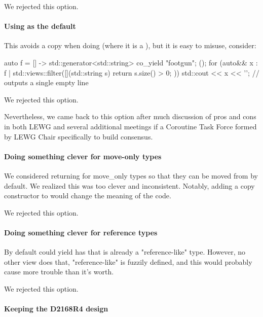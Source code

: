 \documentclass{wg21}
\begin{document}
We rejected this option.

\paragraph{Using  as the default}

This avoids a copy when doing  (where it is a ),
but it is easy to misuse, consider:

\begin{colorblock}
auto f = [] -> std::generator<std::string> { co_yield "footgun"; }();
for (auto&& x : f | std::views::filter([](std::string s) { return s.size() > 0; })) {
    std::cout << x << '\n'; // outputs a single empty line
}
\end{colorblock}

We rejected this option.
\begin{note}
Nevertheless, we came back to this option
after much discussion of pros and cons
in both LEWG and several additional meetings
if a Coroutine Task Force formed by LEWG Chair
specifically to build consensus.
\end{note}

\paragraph{Doing something clever for move-only types}

We considered returning  for move_only types so that they can be moved from by default.
We realized this was too clever and inconsistent.
Notably, adding a copy constructor to  would change the meaning of the code.

We rejected this option.

\paragraph{Doing something clever for reference types}

By default  could yield  has that is already a "reference-like" type.
However, no other view does that, "reference-like" is fuzzily defined, and this would probably cause more trouble than it's worth.

We rejected this option.

\paragraph{Keeping the D2168R4 design}
\end{document}
